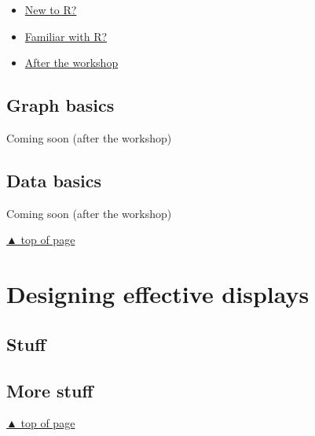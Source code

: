 \documentclass[
]{book}
\providecommand{\tightlist}{%
  \setlength{\itemsep}{0pt}\setlength{\parskip}{0pt}}
\begin{document}
\begin{itemize}
\tightlist
\item
  \protect\hyperlink{new-to-r}{New to R?}\\
\item
  \protect\hyperlink{familiar-with-r}{Familiar with R?}\\
\item
  \protect\hyperlink{after-the-workshop}{After the workshop}
\end{itemize}

\hypertarget{graph-basics}{%
\section{Graph basics}\label{graph-basics}}

Coming soon (after the workshop)

\hypertarget{data-basics}{%
\section{Data basics}\label{data-basics}}

Coming soon (after the workshop)

\protect\hyperlink{start-with-R}{▲ top of page}

\hypertarget{display-design}{%
\chapter{Designing effective displays}\label{display-design}}

\hypertarget{stuff-2}{%
\section{Stuff}\label{stuff-2}}

\hypertarget{more-stuff-2}{%
\section{More stuff}\label{more-stuff-2}}

\protect\hyperlink{display-design}{▲ top of page}

  
\end{document}
